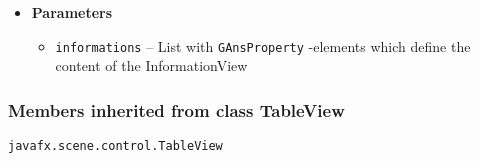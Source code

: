 {{{{{{{{{{{{\begin{itemize}
{\begin{itemize}
{Sets the properties which should be shown in the InformationView. The \texttt{\small GAnsProperty}{\small 
{}} are being processed in an internal factory, which automatically creates the tablecells. The function will be called whenever the selection of the \texttt{\small GraphView}{\small 
{}} changes.
}
\item{
{\bf  Parameters}
  \begin{itemize}
   \item{
\texttt{informations} -- List with \texttt{\small GAnsProperty}{\small 
{}}-elements which define the content of the InformationView}
  \end{itemize}
}%
\end{itemize}
}%
\end{itemize}
}
\subsubsection{Members inherited from class TableView }{
\texttt{javafx.scene.control.TableView} {\small 
{}}
{\small 

}}}}}}}}}}}}}
